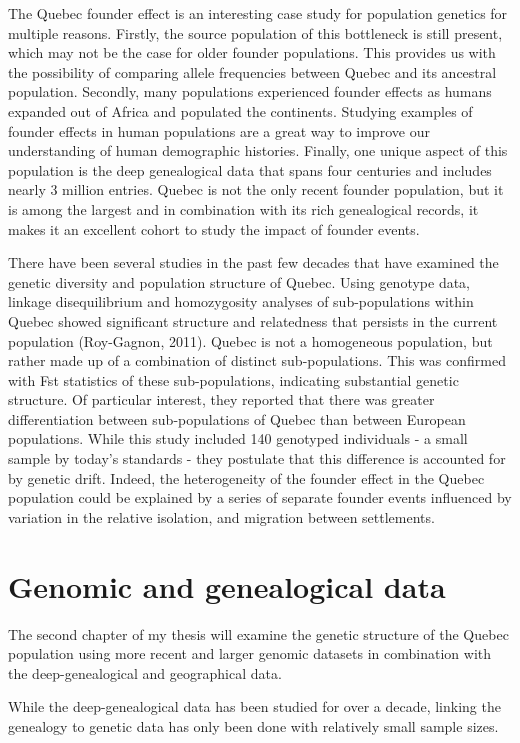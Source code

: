 \documentclass[
11pt, %
oneside, %
english, %
doublespacing, %
headsepline, %
]{MastersDoctoralThesis} %
\begin{document}
The Quebec founder effect is an interesting case study for population genetics for multiple reasons.
Firstly, the source population of this bottleneck is still present, which may not be the case for older founder populations. 
This provides us with the possibility of comparing allele frequencies between Quebec and its ancestral population.
Secondly, many populations experienced founder effects as humans expanded out of Africa and populated the continents.
Studying examples of founder effects in human populations are a great way to improve our understanding of human demographic histories.
Finally, one unique aspect of this population is the deep genealogical data that spans four centuries and includes nearly 3 million entries.
Quebec is not the only recent founder population, but it is among the largest and in combination with its rich genealogical records, it makes it an excellent cohort to study the impact of founder events.

There have been several studies in the past few decades that have examined the genetic diversity and population structure of Quebec.
Using genotype data, linkage disequilibrium and homozygosity analyses of sub-populations within Quebec showed significant structure and relatedness that persists in the current population (Roy-Gagnon, 2011).
Quebec is not a homogeneous population, but rather made up of a combination of distinct sub-populations.
This was confirmed with Fst statistics of these sub-populations, indicating substantial genetic structure.
Of particular interest, they reported that there was greater differentiation between sub-populations of Quebec than between European populations.
While this study included 140 genotyped individuals - a small sample by today's standards - they postulate that this difference is accounted for by genetic drift.
Indeed, the heterogeneity of the founder effect in the Quebec population could be explained by a series of separate founder events influenced by variation in the relative isolation, and migration between settlements.

\section{Genomic and genealogical data}

The second chapter of my thesis will examine the genetic structure of the Quebec population using more recent and larger genomic datasets in combination with the deep-genealogical and geographical data.

While the deep-genealogical data has been studied for over a decade, linking the genealogy to genetic data has only been done with relatively small sample sizes. 
\end{document}
